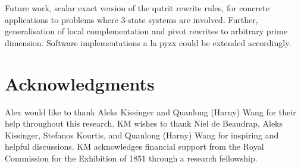\documentclass[submission,copyright,creativecommons]{eptcs}
\begin{document}
Future work, scalar exact version of the qutrit rewrite rules,
for concrete applications to problems where $3$-state systems are involved.
Further,
generalisation of local complementation and pivot rewrites to arbitrary prime dimension.
Software implementations a la pyzx could be extended accordingly.



\section{Acknowledgments}
Alex would like to thank Aleks Kissinger and Quanlong (Harny) Wang for their help throughout this research.
KM wishes to thank Niel de Beaudrap, Aleks Kissinger, Stefanos 
Kourtis, and Quanlong (Harny) Wang for inspiring and helpful discussions.
KM acknowledges financial support from the Royal Commission for the Exhibition of 1851 through a research fellowship.









\end{document}
